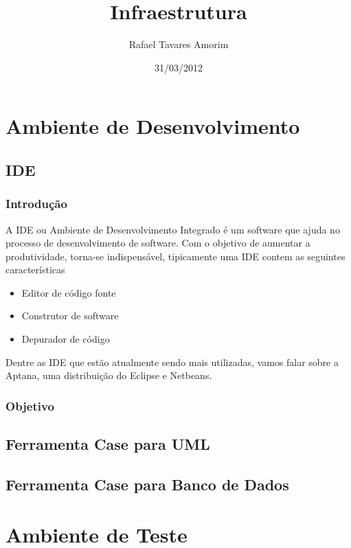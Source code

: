 \documentclass[12pt,a4paper]{article}
\begin{document}
\title{Infraestrutura}
\author{Rafael Tavares Amorim}
\date{31/03/2012}
\maketitle
\thispagestyle{empty}
\newpage
\tableofcontents
\thispagestyle{empty}
\newpage
\section{Ambiente de Desenvolvimento}
	\subsection{IDE}
		\subsubsection{Introdução}

				A IDE ou Ambiente de Desenvolvimento Integrado é um software que ajuda no
				processo de desenvolvimento de software. Com o objetivo de aumentar a
				produtividade, torna-se indispensável, tipicamente uma IDE contem as
				seguintes características
				\begin{itemize}
					\item Editor de código fonte
					\item Construtor de software
					\item Depurador de código
				\end{itemize}
				
				Dentre as IDE que estão atualmente sendo mais utilizadas, vamos falar sobre
				a Aptana, uma distribuição do Eclipse e Netbeans.
				

		\subsubsection{Objetivo}


	\subsection{Ferramenta Case para UML}
	\subsection{Ferramenta Case para Banco de Dados}

\section{Ambiente de Teste}
\end{document}
